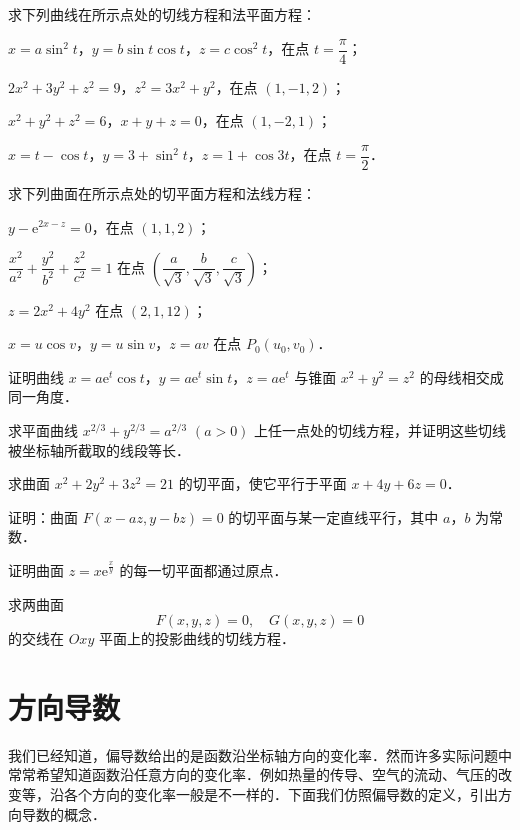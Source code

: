 \begin{xiti}
\item 求下列曲线在所示点处的切线方程和法平面方程：
\begin{ziti}
\item $x=a\sin^{2}t$，$y=b\sin t\cos t$，$z=c\cos^{2}t$，在点 $t=\dfrac{\pi}{4}$；
\item $2x^{2}+3y^{2}+z^{2}=9$，$z^{2}=3x^{2}+y^{2}$，在点 $(1,-1,2)$；
\item $x^{2}+y^{2}+z^{2}=6$，$x+y+z=0$，在点 $(1,-2,1)$；
\item $x=t-\cos t$，$y=3+\sin^{2}t$，$z=1+\cos 3t$，在点 $t=\dfrac{\pi}{2}$．
\end{ziti}
\item 求下列曲面在所示点处的切平面方程和法线方程：
\begin{ziti}
\item $y-\mathrm{e}^{2x-z}=0$，在点 $(1,1,2)$；
\item $\dfrac{x^{2}}{a^{2}}+\dfrac{y^{2}}{b^{2}}+\dfrac{z^{2}}{c^{2}}=1$ 在点 $\left(\dfrac{a}{\sqrt{3}},\dfrac{b}{\sqrt{3}},\dfrac{c}{\sqrt{3}}\right)$；
\item $z=2x^{2}+4y^{2}$ 在点 $(2,1,12)$；
\item $x=u\cos v$，$y=u\sin v$，$z=av$ 在点 $P_{0}(u_{0},v_{0})$．
\end{ziti}
\item 证明曲线 $x=a\mathrm{e}^{t}\cos t$，$y=a\mathrm{e}^{t}\sin t$，$z=a\mathrm{e}^{t}$ 与锥面 $x^{2}+y^{2}=z^{2}$ 的母线相交成同一角度．
\item 求平面曲线 $x^{2/3}+y^{2/3}=a^{2/3}$ $(a>0)$ 上任一点处的切线方程，并证明这些切线被坐标轴所截取的线段等长．
\item 求曲面 $x^{2}+2y^{2}+3z^{2}=21$ 的切平面，使它平行于平面 $x+4y+6z=0$．
\item 证明：曲面 $F(x-az,y-bz)=0$ 的切平面与某一定直线平行，其中 $a$，$b$ 为常数．
\item 证明曲面 $z=x\mathrm{e}^{\frac{x}{y}}$ 的每一切平面都通过原点．
\item 求两曲面
\[
F(x,y,z)=0,\quad G(x,y,z)=0
\]
的交线在 $Oxy$ 平面上的投影曲线的切线方程．
\end{xiti}

\section{方向导数}

我们已经知道，偏导数给出的是函数沿坐标轴方向的变化率．然而许多实际问题中常常希望知道函数沿任意方向的变化率．例如热量的传导、空气的流动、气压的改变等，沿各个方向的变化率一般是不一样的．下面我们仿照偏导数的定义，引出方向导数的概念．

